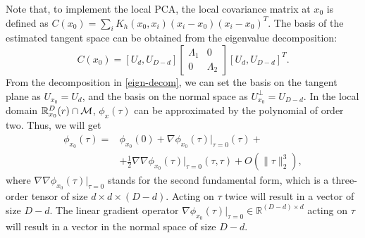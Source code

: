 \documentclass{article}
\theoremstyle{remark}
\begin{document}
Note that, to implement the local PCA, the local covariance matrix at $x_0$ is defined as $C(x_0) = \sum_i K_h(x_0,x_i) (x_i-x_0)(x_i-x_0)^T$. The basis of the estimated tangent space can be obtained from the eigenvalue decomposition:
\begin{equation}\label{eign-decom}
C(x_0) = [U_d , U_{D-d}] 
\left[
\begin{array}{cc}
\Lambda_1& 0\\
0 & \Lambda_2
\end{array}\right]
 [U_d , U_{D-d}]^T.
\end{equation}
From the decomposition in \eqref{eign-decom}, we can set the basis on the tangent plane as $U_{x_0} = U_d$, and the basis on the normal space as $U_{x_0}^\perp = U_{D-d}$. In the local domain ${\mathbb R}_{x_0}^D (r)\cap \cal M$,  $\phi_x(\tau)$ can be approximated by the polynomial of order two. Thus, we will get
\begin{equation}\label{app_phi}
\begin{aligned}
\phi_{x_0}(\tau) =& \phi_{x_0}(0)+ \nabla {\phi_{x_0}}(\tau)|_{\tau=0}(\tau)+ \\
&+\frac{1}{2}{\nabla\nabla\phi_{x_0}(\tau)|_{\tau=0}}(\tau, \tau)+O(\|\tau\|_2^3),
\end{aligned}
\end{equation}
where ${\nabla\nabla\phi_{x_0}(\tau)|_{\tau=0}}$ stands for the second fundamental form, which is a three-order tensor of size $ d\times d\times (D-d)$. Acting on $\tau$ twice will result in a vector of size $D-d$.  The linear gradient operator  $\nabla {\phi_{x_0}}(\tau)|_{\tau=0}\in \mathbb{R}^{{(D-d)}\times d}$ acting on $\tau$ will result in a vector in the normal space of size $D-d$.
\end{document}
